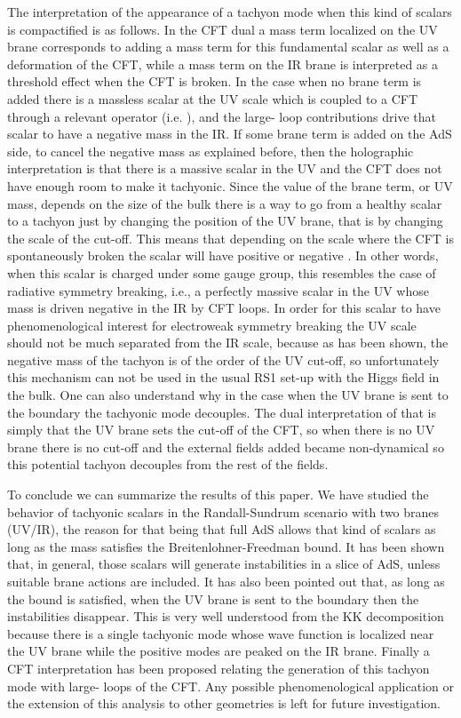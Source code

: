 \documentclass[a4paper,12pt,dvips]{article}
\begin{document}
The interpretation of the appearance of a tachyon mode when this
kind of scalars is compactified is as follows. In the CFT dual a
mass term localized on the UV brane corresponds to adding a mass
term for this fundamental scalar as well as a deformation of the
CFT, while a mass term on the IR brane is interpreted as a
threshold effect when the CFT is broken. In the case when no brane
term is added there is a massless scalar at the UV scale which is
coupled to a CFT through a relevant operator (i.e. \coordHE{}),
and the large-\coordHE{} loop contributions drive that scalar to have a
negative mass in the IR. If some brane term is added on the AdS
side, to cancel the negative mass as explained before, then the
holographic interpretation is that there is a massive scalar
in the UV and the CFT does not have enough room to make it
tachyonic. Since the value of the brane term, or UV mass, depends
on the size of the bulk there is a way to go from a healthy scalar
to a tachyon just by changing the position of the UV brane, that
is by changing the scale of the cut-off.
 This means that depending on the scale where the CFT is
spontaneously broken the scalar will have positive or negative
\coordHE{}. In other words, when this scalar is charged under some
gauge group, this resembles the case of radiative symmetry
breaking, i.e., a perfectly massive scalar in the UV whose mass
is driven negative in the IR by CFT loops. In order for this scalar
to have phenomenological interest for electroweak symmetry
breaking the UV scale should not be much separated from the IR
scale, because as has been shown, the negative mass of the tachyon
is of the order of the UV cut-off, so unfortunately this mechanism
can not be used in the usual RS1 set-up with the Higgs field in
the bulk. One can also understand why in the case when the UV
brane is sent to the boundary the tachyonic mode decouples. The
dual interpretation of that is simply that the UV brane sets the
cut-off of the CFT, so when there is no UV brane there is no
cut-off and the external fields added became non-dynamical so this
potential tachyon decouples from the rest of the fields.

To conclude we can summarize the results of this paper. We have
studied the behavior of tachyonic scalars in the Randall-Sundrum
scenario with two branes (UV/IR), the reason for that being that
full AdS allows that kind of scalars as long as the mass satisfies
the Breitenlohner-Freedman bound. It has been shown that, in
general, those scalars will generate instabilities in a slice of
AdS, unless suitable brane actions are included. It has also been
pointed out that, as long as the bound is satisfied, when the UV
brane is sent to the boundary then the instabilities disappear.
This is very well understood from the KK decomposition because
there is a single tachyonic mode whose wave function is localized
near the UV brane while the positive modes are peaked on the IR
brane. Finally a CFT interpretation has been proposed relating the
generation of this tachyon mode with large-\coordHE{} loops of the CFT.
Any possible phenomenological application or the extension of this
analysis to other geometries is left for future investigation.
\end{document}
